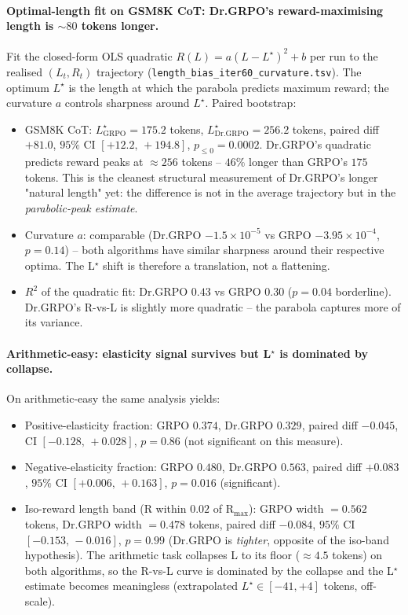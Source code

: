 \paragraph{Optimal-length fit on GSM8K CoT: Dr.GRPO's reward-maximising
length is $\sim 80$ tokens longer.}
Fit the closed-form OLS quadratic
$R(L) = a (L - L^\star)^2 + b$ per run to the realised $(L_t, R_t)$
trajectory (\texttt{length\_bias\_iter60\_curvature.tsv}). The optimum
$L^\star$ is the length at which the parabola predicts maximum reward;
the curvature $a$ controls sharpness around $L^\star$. Paired bootstrap:
\begin{itemize}
\item GSM8K CoT:
      $L^\star_{\text{GRPO}} = 175.2$ tokens,
      $L^\star_{\text{Dr.GRPO}} = 256.2$ tokens,
      paired diff $+81.0$, $95\%$ CI $[+12.2,\, +194.8]$,
      $p_{\le 0} = 0.0002$. Dr.GRPO's quadratic predicts reward peaks
      at $\approx 256$ tokens -- $46\%$ longer than GRPO's
      $175$ tokens. This is the cleanest structural measurement of
      Dr.GRPO's longer "natural length" yet: the difference is not in
      the average trajectory but in the \emph{parabolic-peak estimate}.
\item Curvature $a$: comparable (Dr.GRPO $-1.5 \times 10^{-5}$ vs
      GRPO $-3.95 \times 10^{-4}$, $p = 0.14$) -- both algorithms have
      similar sharpness around their respective optima. The L$^\star$
      shift is therefore a translation, not a flattening.
\item $R^2$ of the quadratic fit: Dr.GRPO $0.43$ vs GRPO $0.30$
      ($p = 0.04$ borderline). Dr.GRPO's R-vs-L is slightly more
      quadratic -- the parabola captures more of its variance.
\end{itemize}

\paragraph{Arithmetic-easy: elasticity signal survives but L$^\star$ is
dominated by collapse.}
On arithmetic-easy the same analysis yields:
\begin{itemize}
\item Positive-elasticity fraction: GRPO $0.374$, Dr.GRPO $0.329$, paired
      diff $-0.045$, CI $[-0.128,\, +0.028]$, $p = 0.86$ (not
      significant on this measure).
\item Negative-elasticity fraction: GRPO $0.480$, Dr.GRPO $0.563$, paired
      diff $+0.083$, $95\%$ CI $[+0.006,\, +0.163]$, $p = 0.016$
      (significant).
\item Iso-reward length band (R within $0.02$ of R$_\text{max}$): GRPO
      width $= 0.562$ tokens, Dr.GRPO width $= 0.478$ tokens, paired
      diff $-0.084$, $95\%$ CI $[-0.153,\, -0.016]$, $p = 0.99$
      (Dr.GRPO is \emph{tighter}, opposite of the iso-band hypothesis).
      The arithmetic task collapses L to its floor ($\approx 4.5$
      tokens) on both algorithms, so the R-vs-L curve is dominated by
      the collapse and the L$^\star$ estimate becomes meaningless
      (extrapolated $L^\star \in [-41, +4]$ tokens, off-scale).
\end{itemize}

